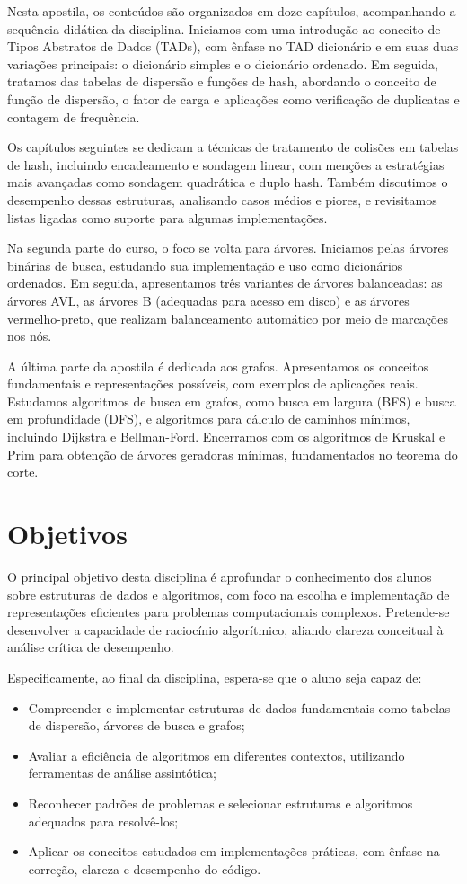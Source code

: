 Nesta apostila, os conteúdos são organizados em doze capítulos, acompanhando a sequência didática da disciplina. 
Iniciamos com uma introdução ao conceito de Tipos Abstratos de Dados (TADs), com ênfase no TAD dicionário e em suas duas variações principais: o dicionário simples e o dicionário ordenado. 
Em seguida, tratamos das tabelas de dispersão e funções de hash, abordando o conceito de função de dispersão, o fator de carga e aplicações como verificação de duplicatas e contagem de frequência.

Os capítulos seguintes se dedicam a técnicas de tratamento de colisões em tabelas de hash, incluindo encadeamento e sondagem linear, com menções a estratégias mais avançadas como sondagem quadrática e duplo hash. 
Também discutimos o desempenho dessas estruturas, analisando casos médios e piores, e revisitamos listas ligadas como suporte para algumas implementações.

Na segunda parte do curso, o foco se volta para árvores. 
Iniciamos pelas árvores binárias de busca, estudando sua implementação e uso como dicionários ordenados. 
Em seguida, apresentamos três variantes de árvores balanceadas: 
as árvores AVL, as árvores B (adequadas para acesso em disco) e as árvores vermelho-preto, que realizam balanceamento automático por meio de marcações nos nós.

A última parte da apostila é dedicada aos grafos. 
Apresentamos os conceitos fundamentais e representações possíveis, com exemplos de aplicações reais. 
Estudamos algoritmos de busca em grafos, como busca em largura (BFS) e busca em profundidade (DFS), e algoritmos para cálculo de caminhos mínimos, incluindo Dijkstra e Bellman-Ford. 
Encerramos com os algoritmos de Kruskal e Prim para obtenção de árvores geradoras mínimas, fundamentados no teorema do corte.

\section*{Objetivos}

O principal objetivo desta disciplina é aprofundar o conhecimento dos alunos sobre estruturas de dados e algoritmos, com foco na escolha e implementação de representações eficientes para problemas computacionais complexos. 
Pretende-se desenvolver a capacidade de raciocínio algorítmico, aliando clareza conceitual à análise crítica de desempenho.

Especificamente, ao final da disciplina, espera-se que o aluno seja capaz de:
\begin{itemize}
  \item Compreender e implementar estruturas de dados fundamentais como tabelas de dispersão, árvores de busca e grafos;
  \item Avaliar a eficiência de algoritmos em diferentes contextos, utilizando ferramentas de análise assintótica;
  \item Reconhecer padrões de problemas e selecionar estruturas e algoritmos adequados para resolvê-los;
  \item Aplicar os conceitos estudados em implementações práticas, com ênfase na correção, clareza e desempenho do código.
\end{itemize}

